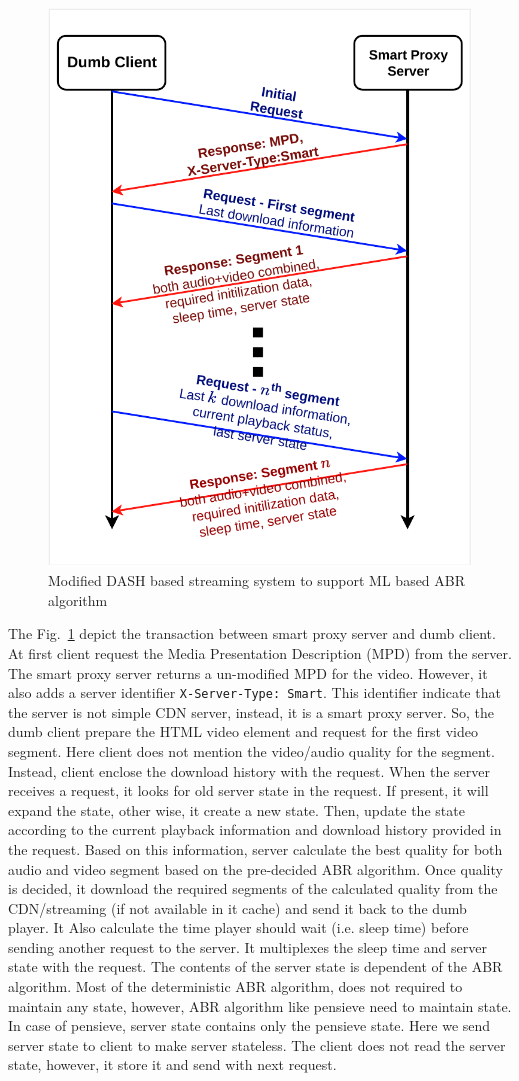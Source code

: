 \begin{figure}[h]
	\begin{center}
		\includegraphics[width=0.5\linewidth]{img/splitDASHTransaction}
	\end{center}
	\caption{\label{fig:splitDASHTransaction} Modified DASH based streaming system to support ML based ABR algorithm}
\end{figure}

The Fig.~\ref{fig:splitDASHTransaction} depict the transaction between smart proxy server and dumb client. At first client request the Media Presentation Description (MPD) from the server. The smart proxy server returns a un-modified MPD for the video. However, it also adds a server identifier {\tt X-Server-Type: Smart}. This identifier indicate that the server is not simple CDN server, instead, it is a smart proxy server. So, the dumb client prepare the HTML video element and request for the first video segment. Here client does not mention the video/audio quality for the segment. Instead, client enclose the download history with the request. When the server receives a request, it looks for old server state in the request. If present, it will expand the state, other wise, it create a new state. Then, update the state according to the current playback information and download history provided in the request. Based on this information, server calculate the best quality for both audio and video segment based on the pre-decided ABR algorithm. Once quality is decided, it download the required segments of the calculated quality from the CDN/streaming (if not available in it cache) and send it back to the dumb player. It Also calculate the time player should wait (i.e. sleep time) before sending another request to the server. It multiplexes the sleep time and server state with the request. The contents of the server state is dependent of the ABR algorithm. Most of the deterministic ABR algorithm, does not required to maintain any state, however, ABR algorithm like pensieve need to maintain state. In case of pensieve, server state contains only the pensieve state.
Here we send server state to client to make server stateless. The client does not read the server state, however, it store it and send with next request.


